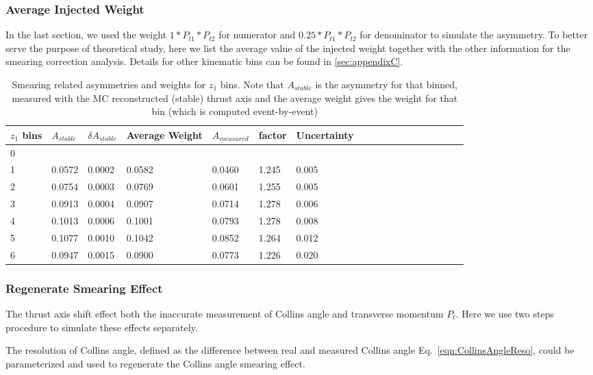 \subsubsection{Average Injected Weight}
In the last section, we used the weight $1*P_{t1}*P_{t2}$ for numerator and $0.25*P_{t1}*P_{t2}$ for denominator to simulate the asymmetry. To better serve the purpose of theoretical study, here we list the average value of the injected weight together with the other information for the smearing correction analysis. Details for other kinematic bins can be found in \ref{sec:appendixC}.
\begin{table}[H]\footnotesize
\centering
\begin{tabular}{|l|l|l|l|l|l|l|l|l|l|l|l|l|l|l|l|l|l|}
\hline
$z_1$ bins & $A_{stable}$ & $\delta A_{stable}$ & Average Weight &  $A_{measured}$ & factor  & Uncertainty\\ \hline
0	&		&		&		&		&		&		\\ \hline
1	&	0.0572	&	0.0002	&	0.0582	&	0.0460	&	1.245	&	0.005	\\ \hline
2	&	0.0754	&	0.0003	&	0.0769	&	0.0601	&	1.255	&	0.005	\\ \hline
3	&	0.0913	&	0.0004	&	0.0907	&	0.0714	&	1.278	&	0.006	\\ \hline
4	&	0.1013	&	0.0006	&	0.1001	&	0.0793	&	1.278	&	0.008	\\ \hline
5	&	0.1077	&	0.0010	&	0.1042	&	0.0852	&	1.264	&	0.012	\\ \hline
6	&	0.0947	&	0.0015	&	0.0900	&	0.0773	&	1.226	&	0.020	\\ \hline
\end{tabular}
\caption{Smearing related asymmetries and weights for $z_1$ bins. Note that $A_{stable}$ is the asymmetry for that binned, measured with the MC reconstructed (stable) thrust axis and the average weight gives the weight for that bin (which is computed event-by-event)}
\label{tab:sinz_smearing_info}
\end{table}

\iffalse
\subsubsection{\texorpdfstring{Regenerate Smearing Effect}{Regenerated Smearing Effect}} 
\label{sec:regeneratedsmearing}
The thrust axis shift effect both the inaccurate measurement of Collins angle and transverse momentum $P_t$. Here we use two steps procedure to simulate these effects separately.

The resolution of Collins angle, defined as the difference between real and measured Collins angle Eq.~\ref{eqn:CollinsAngleReso}, could be parameterized and used to regenerate the Collins angle smearing effect. 

